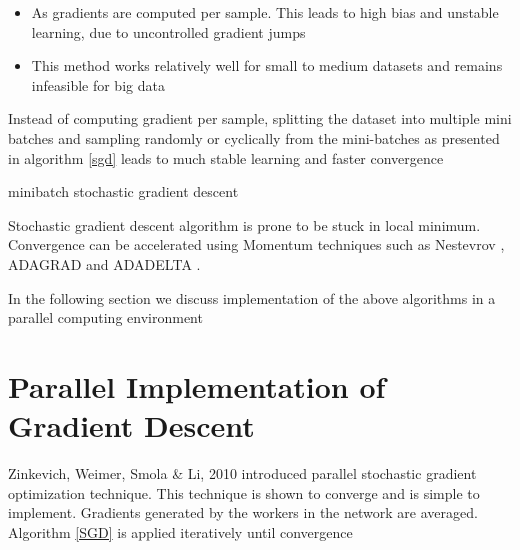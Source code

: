 \documentclass[sigconf]{acmart}
\begin{document}
\begin{itemize}

\item As gradients are computed per sample. This leads to high bias and unstable learning, due to uncontrolled gradient jumps

\item This method works relatively well for small to medium datasets and remains infeasible for big data

\end{itemize}

Instead of computing gradient per sample, splitting the dataset into multiple mini batches \cite{Bottou2010} and sampling randomly or cyclically from the mini-batches as presented in algorithm \ref{sgd} leads to much stable learning and faster convergence

\begin{algorithm}

\caption{minibatch stochastic gradient descent} \label{sgd}

\begin{algorithmic}[1] 
\EndWhile
\end{algorithmic}

\end{algorithm}

Stochastic gradient descent algorithm is prone to be stuck in local minimum. Convergence can be accelerated using Momentum techniques such as Nestevrov \cite{Duchi}, ADAGRAD \cite{Duchi} and ADADELTA \cite{DBLP}.

In the following section we discuss implementation of the above algorithms in a parallel computing environment
  
\section{Parallel Implementation of Gradient Descent} \label{deploy}

Zinkevich, Weimer,  Smola \& Li, 2010 \cite{NIPS20104006} introduced parallel stochastic gradient optimization technique. This technique is shown to converge and is simple to implement.  Gradients generated by the workers in the network are averaged. Algorithm \ref{SGD} is applied iteratively until convergence 
\end{document}
